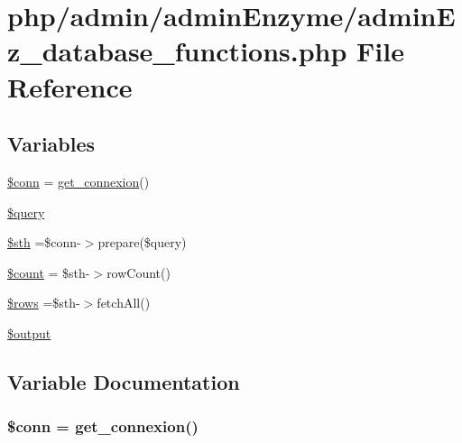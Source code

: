 \hypertarget{admin_ez__database__functions_8php}{\section{php/admin/admin\-Enzyme/admin\-Ez\-\_\-database\-\_\-functions.php File Reference}
\label{admin_ez__database__functions_8php}
}
\subsection*{Variables}
\begin{DoxyCompactItemize}
\item 
\hyperlink{admin_ez__database__functions_8php_aa8a5a87b9c1a6a0819b88447cbe41877}{\$conn} = \hyperlink{php__functions_8php_ace18bc10f3fd08f92688ac743e0d8c2e}{get\-\_\-connexion}()
\item 
\hyperlink{admin_ez__database__functions_8php_af59a5f7cd609e592c41dc3643efd3c98}{\$query}
\item 
\hyperlink{admin_ez__database__functions_8php_afa9126f9664959c02795be300a135f93}{\$sth} =\$conn-\/$>$prepare(\$query)
\item 
\hyperlink{admin_ez__database__functions_8php_af789423037bbc89dc7c850e761177570}{\$count} = \$sth-\/$>$row\-Count()
\item 
\hyperlink{admin_ez__database__functions_8php_ace2ec39e7df3899fa8df9640ec274b03}{\$rows} =\$sth-\/$>$fetch\-All()
\item 
\hyperlink{admin_ez__database__functions_8php_a73004ce9cd673c1bfafd1dc351134797}{\$output}
\end{DoxyCompactItemize}


\subsection{Variable Documentation}
\hypertarget{admin_ez__database__functions_8php_aa8a5a87b9c1a6a0819b88447cbe41877}{
\subsubsection[{\$conn}]{\setlength{\rightskip}{0pt plus 5cm}\$conn = {\bf get\-\_\-connexion}()}}\label{admin_ez__database__functions_8php_aa8a5a87b9c1a6a0819b88447cbe41877}


